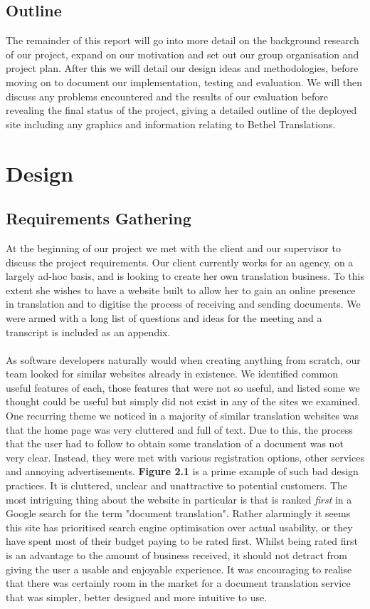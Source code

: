 \documentclass{l3proj}
\begin{document}
\section{Outline}
The remainder of this report will go into more detail on the background research
of our project, expand on our motivation and set out our group organisation and
project plan. After this we will detail our design ideas and methodologies,
before moving on to document our implementation, testing and evaluation. We will
then discuss any problems encountered and the results of our evaluation before
revealing the final status of the project, giving a detailed outline of the
deployed site including any graphics and information relating to Bethel
Translations.
 

\chapter{Design}
\label{chap:design}
\section{Requirements Gathering}

At the beginning of our project we met with the client and our supervisor to
discuss the project requirements. Our client currently works for
an agency, on a largely ad-hoc basis, and is looking to create her own translation
business. To this extent she wishes to have a website built to allow her to gain
an online presence in translation and to digitise the process of receiving and
sending documents. We were armed with a long list of questions and ideas for
the meeting and a transcript is included as an appendix.\\
\\
As software developers naturally would when creating anything from scratch, our
team looked for similar websites already in existence. We identified common
useful features of each, those features that were not so useful, and
listed some we thought could be useful but simply did not exist in any of the
sites we examined. One recurring theme we noticed in a majority of similar
translation websites was that the home page was very cluttered and full of text.
Due to this, the process that the user had to follow to obtain some
translation of a document was not very clear. Instead, they were met with
various registration options, other services and annoying advertisements.
\textbf{Figure 2.1} is a prime example of such bad design practices. It is
cluttered, unclear and unattractive to potential customers. The most intriguing
thing about the website in particular is that is ranked \textit{first} in a
Google search for the term "document translation". Rather alarmingly it seems
this site has prioritised search engine optimisation over actual usability, or
they have spent most of their budget paying to be rated first. Whilst being
rated first is an advantage to the amount of business received, it should not
detract from giving the user a usable and enjoyable experience. It was
encouraging to realise that there was certainly room in the market for a
document translation service that was simpler, better designed and more
intuitive to use.
\end{document}
